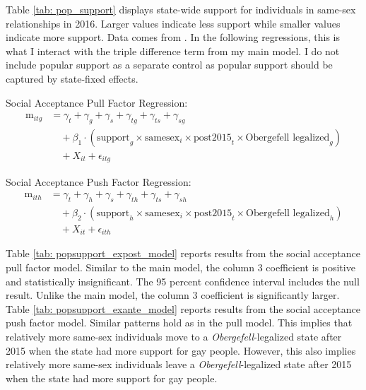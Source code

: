 \documentclass[12pt,letterpaper]{article}
\begin{document}


Table \ref{tab: pop_support} displays state-wide support for individuals in same-sex relationships in 2016. Larger values indicate less support while smaller values indicate more support. Data comes from \citet{29}. In the following regressions, this is what I interact with the triple difference term from my main model. I do not include popular support as a separate control as popular support should be captured by state-fixed effects.

\hfill
\break
Social Acceptance Pull Factor Regression:
\begin{equation}
\begin{aligned}
\text{m}_{itg} &= \gamma_t + \gamma_g + \gamma_s + \gamma_{tg} + \gamma_{ts} + \gamma_{sg} \\
&\quad + \beta_1 \cdot (\text{support}_g \times \text{samesex}_i \times \text{post2015}_t \times \text{Obergefell legalized}_g) \\
&\quad + X_{it} + \epsilon_{itg}
\end{aligned}
\end{equation}

\hfill
\break
Social Acceptance Push Factor Regression:
\begin{equation}
\begin{aligned}
\text{m}_{ith} &= \gamma_t + \gamma_h + \gamma_s + \gamma_{th} + \gamma_{ts} + \gamma_{sh} \\
&\quad + \beta_2 \cdot (\text{support}_h \times \text{samesex}_i \times \text{post2015}_t \times \text{Obergefell legalized}_h) \\
&\quad + X_{it} + \epsilon_{ith}
\end{aligned}
\end{equation}

Table \ref{tab: popsupport_expost_model} reports results from the social acceptance pull factor model. Similar to the main model, the column 3 coefficient is positive and statistically insignificant. The 95 percent confidence interval includes the null result. Unlike the main model, the column 3 coefficient is significantly larger. Table \ref{tab: popsupport_exante_model} reports results from the social acceptance push factor model. Similar patterns hold as in the pull model. This implies that relatively more same-sex individuals move to a \textit{Obergefell}-legalized state after 2015 when the state had more support for gay people. However, this also implies relatively more same-sex individuals leave a \textit{Obergefell}-legalized state after 2015 when the state had more support for gay people. 
\end{document}
